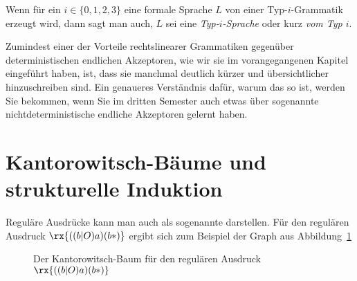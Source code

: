 Wenn für ein $i\in\{0,1,2,3\}$ eine formale Sprache $L$ von einer
Typ-$i$-Grammatik erzeugt wird, dann sagt man auch, $L$ sei eine
\emph{Typ-$i$-Sprache} oder kurz \emph{vom Typ $i$}.

Zumindest einer der Vorteile rechtslinearer Grammatiken gegenüber
deterministischen endlichen Akzeptoren, wie wir sie im vorangegangenen
Kapitel eingeführt haben, ist, dass sie manchmal deutlich kürzer und
übersichtlicher hinzuschreiben sind. Ein genaueres Verständnis dafür,
warum das so ist, werden Sie bekommen, wenn Sie im dritten Semester
auch etwas über sogenannte nichtdeterministische endliche Akzeptoren
gelernt haben.

\Tut\section{Kantorowitsch-B\"aume und strukturelle Induktion}
\label{sec:strukturelle-induktion}

Reguläre Ausdrücke kann man auch als sogenannte
%
 darstellen. Für den
regulären Ausdruck $\rx{((b|O)a)(b*)}$ ergibt sich zum Beispiel der
Graph aus Abbildung~\ref{fig:kantorowitsch-baum}

\begin{figure}[ht]
  \centering
  \caption{Der Kantorowitsch-Baum für den regulären Ausdruck $\protect\rx{((b|O)a)(b*)}$}
  \label{fig:kantorowitsch-baum}
\end{figure}

